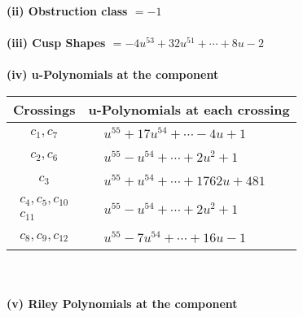 \documentclass[1p]{elsarticle_modified}
\theoremstyle{definition}
\begin{document}
\flushleft \textbf{(ii) Obstruction class $= -1$}\\~\\
\flushleft \textbf{(iii) Cusp Shapes $= -4 u^{53}+32 u^{51}+\cdots+8 u-2$}\\~\\
\newpage\renewcommand{\arraystretch}{1}
\flushleft \textbf{(iv) u-Polynomials at the component}\newline \\
\begin{tabular}{m{50pt}|m{274pt}}
Crossings & \hspace{64pt}u-Polynomials at each crossing \\
\hline $$\begin{aligned}c_{1},c_{7}\end{aligned}$$&$\begin{aligned}
&u^{55}+17 u^{54}+\cdots-4 u+1
\end{aligned}$\\
\hline $$\begin{aligned}c_{2},c_{6}\end{aligned}$$&$\begin{aligned}
&u^{55}- u^{54}+\cdots+2 u^2+1
\end{aligned}$\\
\hline $$\begin{aligned}c_{3}\end{aligned}$$&$\begin{aligned}
&u^{55}+u^{54}+\cdots+1762 u+481
\end{aligned}$\\
\hline $$\begin{aligned}c_{4},c_{5},c_{10}\\c_{11}\end{aligned}$$&$\begin{aligned}
&u^{55}- u^{54}+\cdots+2 u^2+1
\end{aligned}$\\
\hline $$\begin{aligned}c_{8},c_{9},c_{12}\end{aligned}$$&$\begin{aligned}
&u^{55}-7 u^{54}+\cdots+16 u-1
\end{aligned}$\\
\hline
\end{tabular}\\~\\
\newpage\renewcommand{\arraystretch}{1}
\flushleft \textbf{(v) Riley Polynomials at the component}\newline \\
\end{document}
